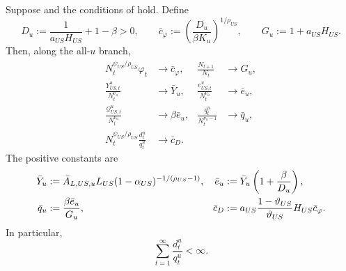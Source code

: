 \documentclass{article}
\def\green#1{#1}%
\begin{document}
\begin{prop}\label{lem_prod_orders}\label{prop_hkt_tail_reduction}
Suppose  and the conditions of  hold.  Define
\begin{equation}\label{Du_cphi_def}
D_u
:=
\frac{1}{a_{US}H_{US}}+1-\beta>0,
\qquad
\bar c_\varphi
:=
\left(\frac{D_u}{\beta K_u}\right)^{1/\rho_{US}},
\qquad
G_u:=1+a_{US}H_{US}.
\end{equation}
Then, along the all-$u$ branch,
\begin{align}
N_t^{\psi_{US}/\rho_{US}}\varphi_t
&\longrightarrow\bar c_\varphi,
&
\frac{N_{t+1}}{N_t}&\longrightarrow G_u,
\label{hkt_phi_growth_limits}\\
\frac{Y_{US,t}^u}{N_t^{\nu_u}}
&\longrightarrow\bar Y_u,
&
\frac{e_{US,t}^u}{N_t^{\nu_u}}&\longrightarrow\bar e_u,
\label{hkt_output_income_limits}\\
\frac{\mathcal Q_{US,t}^u}{N_t^{\nu_u}}
&\longrightarrow\beta\bar e_u,
&
\frac{q_t^u}{N_t^{\nu_u-1}}&\longrightarrow\bar q_u,
\label{hkt_value_price_limits}\\
N_t^{\psi_{US}/\rho_{US}}\frac{d_t^u}{q_t^u}
&\longrightarrow\bar c_D.
\label{hkt_dividend_yield_limit}
\end{align}
The positive constants are
\begin{align}
\bar Y_u
&:=
\bar A_{L,US,u}L_{US}(1-\alpha_{US})^{-1/(\rho_{US}-1)},
&
\bar e_u
&:=
\bar Y_u\left(1+\frac{\beta}{D_u}\right),
\notag\\
\bar q_u
&:=
\frac{\beta\bar e_u}{G_u},
&
\bar c_D
&:=
a_{US}\frac{1-\vartheta_{US}}{\vartheta_{US}}H_{US}\bar c_\varphi.
\label{hkt_limit_constants}
\end{align}
In particular,
\begin{equation}\label{hkt_dividend_summability}
\sum_{t=\green{1}}^{\infty}\frac{d_t^u}{q_t^u}<\infty.
\end{equation}
\end{prop}
\end{document}
